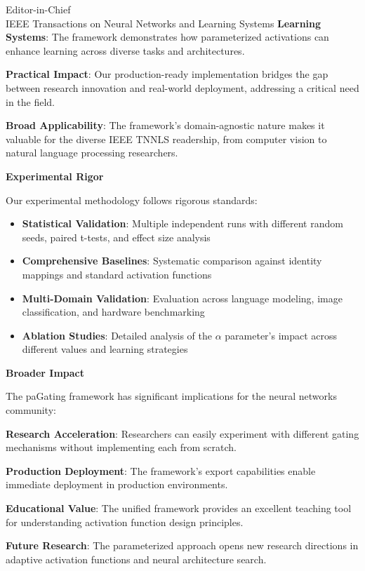 \documentclass[11pt]{letter}
\begin{document}
\begin{letter}{Editor-in-Chief\\
IEEE Transactions on Neural Networks and Learning Systems}
\textbf{Learning Systems}: The framework demonstrates how parameterized activations can enhance learning across diverse tasks and architectures.

\textbf{Practical Impact}: Our production-ready implementation bridges the gap between research innovation and real-world deployment, addressing a critical need in the field.

\textbf{Broad Applicability}: The framework's domain-agnostic nature makes it valuable for the diverse IEEE TNNLS readership, from computer vision to natural language processing researchers.

\textbf{\large Experimental Rigor}

\vspace{0.5em}

Our experimental methodology follows rigorous standards:

\begin{itemize}
    \item \textbf{Statistical Validation}: Multiple independent runs with different random seeds, paired t-tests, and effect size analysis
    \item \textbf{Comprehensive Baselines}: Systematic comparison against identity mappings and standard activation functions
    \item \textbf{Multi-Domain Validation}: Evaluation across language modeling, image classification, and hardware benchmarking
    \item \textbf{Ablation Studies}: Detailed analysis of the $\alpha$ parameter's impact across different values and learning strategies
\end{itemize}

\textbf{\large Broader Impact}

\vspace{0.5em}

The paGating framework has significant implications for the neural networks community:

\textbf{Research Acceleration}: Researchers can easily experiment with different gating mechanisms without implementing each from scratch.

\textbf{Production Deployment}: The framework's export capabilities enable immediate deployment in production environments.

\textbf{Educational Value}: The unified framework provides an excellent teaching tool for understanding activation function design principles.

\textbf{Future Research}: The parameterized approach opens new research directions in adaptive activation functions and neural architecture search.


\end{letter}
\end{document}
